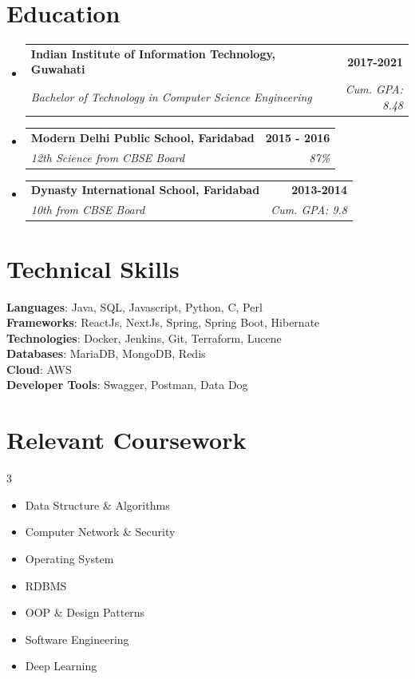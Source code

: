 \documentclass[letterpaper,11pt]{article}
\makeatletter
\newcommand{\resumeSubheading}[4]{
  \vspace{-2pt}\item
    \begin{tabular*}{1.0\textwidth}[t]{l@{\extracolsep{\fill}}r}
      \textbf{#1} & \textbf{\small #2} \\
      \textit{\small#3} & \textit{\small #4} \\
    \end{tabular*}\vspace{-7pt}
}
\newcommand{\resumeSubHeadingListStart}{\begin{itemize}[leftmargin=0.0in, label={}]}
\newcommand{\resumeSubHeadingListEnd}{\end{itemize}}
\makeatother
\begin{document}
\section{Education}
\resumeSubHeadingListStart
\resumeSubheading
{Indian Institute of Information Technology, Guwahati}{2017-2021}
{Bachelor of Technology in Computer Science Engineering}{Cum. GPA: 8.48}

\resumeSubheading
{Modern Delhi Public School, Faridabad}{2015 - 2016}
{12th Science from CBSE Board}{87\%}

\resumeSubheading
{Dynasty International School, Faridabad}{2013-2014}
{10th from CBSE Board}{Cum. GPA: 9.8}

\resumeSubHeadingListEnd

%
\section{Technical Skills}
\begin{itemize}[leftmargin=0.01in, label={}]
	\small{\item{
		\textbf{Languages}{: Java, SQL, Javascript, Python, C, Perl} \\
		\textbf{Frameworks}{: ReactJs, NextJs, Spring, Spring Boot, Hibernate} \\
		\textbf{Technologies}{: Docker, Jenkins, Git, Terraform, Lucene} \\
		\textbf{Databases}{: MariaDB, MongoDB, Redis } \\
		\textbf{Cloud}{: AWS} \\
		\textbf{Developer Tools}{: Swagger, Postman, Data Dog} \\
	}}
\end{itemize}
\vspace{-16pt}



\section{Relevant Coursework}
\begin{multicols}{3}
	\begin{itemize}[itemsep=-5pt, parsep=3pt]
		\item\small Data Structure \& Algorithms
		\item Computer Network \& Security
		\item Operating System
		\item RDBMS
		\item OOP \& Design Patterns
		\item Software Engineering
		\item Deep Learning
	\end{itemize}
\end{multicols}
\vspace*{2.0\multicolsep}
\end{document}
